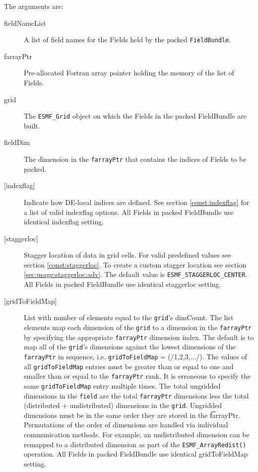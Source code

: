    The arguments are: 
   \begin{description} 
   \item [fieldNameList] 
   A list of field names for the Fields held by the packed {\tt FieldBundle}. 
   \item[farrayPtr] 
   Pre-allocated Fortran array pointer holding the memory of the list of Fields. 
   \item [grid] 
   The {\tt ESMF\_Grid} object on which the Fields in the packed FieldBundle are built. 
   \item [fieldDim] 
   The dimension in the {\tt farrayPtr} that contains the indices of Fields to be packed. 
   \item [{[indexflag]}] 
   Indicate how DE-local indices are defined. See section 
   \ref{const:indexflag} for a list of valid indexflag options. 
   All Fields in packed FieldBundle use identical indexflag setting. 
   \item [{[staggerloc]}] 
   Stagger location of data in grid cells. For valid 
   predefined values see section \ref{const:staggerloc}. 
   To create a custom stagger location see section 
   \ref{sec:usage:staggerloc:adv}. The default 
   value is {\tt ESMF\_STAGGERLOC\_CENTER}. 
   All Fields in packed FieldBundle use identical staggerloc setting. 
   \item [{[gridToFieldMap]}] 
   List with number of elements equal to the 
   {\tt grid}'s dimCount. The list elements map each dimension 
   of the {\tt grid} to a dimension in the {\tt farrayPtr} by 
   specifying the appropriate {\tt farrayPtr} dimension index. 
   The default is to 
   map all of the {\tt grid}'s dimensions against the lowest dimensions of 
   the {\tt farrayPtr} in sequence, i.e. {\tt gridToFieldMap} = (/1,2,3,.../). 
   The values of all {\tt gridToFieldMap} entries must be greater than or equal 
   to one and smaller than or equal to the {\tt farrayPtr} rank. 
   It is erroneous to specify the same {\tt gridToFieldMap} entry 
   multiple times. The total ungridded dimensions in the {\tt field} 
   are the total {\tt farrayPtr} dimensions less 
   the total (distributed + undistributed) dimensions in 
   the {\tt grid}. Ungridded dimensions must be in the same order they are 
   stored in the {\t farrayPtr}. Permutations of the order of 
   dimensions are handled via individual communication methods. For example, 
   an undistributed dimension can be remapped to a distributed dimension 
   as part of the {\tt ESMF\_ArrayRedist()} operation. 
   All Fields in packed FieldBundle use identical gridToFieldMap setting. 

\end{description}
